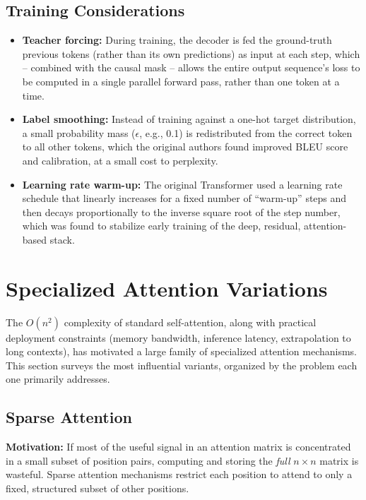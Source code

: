 \documentclass[11pt]{article}
\begin{document}
\subsection*{Training Considerations}

\begin{itemize}[leftmargin=1.5em]
    \item \textbf{Teacher forcing:} During training, the decoder is fed the ground-truth previous tokens (rather than its own predictions) as input at each step, which -- combined with the causal mask -- allows the entire output sequence's loss to be computed in a single parallel forward pass, rather than one token at a time.
    \item \textbf{Label smoothing:} Instead of training against a one-hot target distribution, a small probability mass ($\epsilon$, e.g., 0.1) is redistributed from the correct token to all other tokens, which the original authors found improved BLEU score and calibration, at a small cost to perplexity.
    \item \textbf{Learning rate warm-up:} The original Transformer used a learning rate schedule that linearly increases for a fixed number of ``warm-up'' steps and then decays proportionally to the inverse square root of the step number, which was found to stabilize early training of the deep, residual, attention-based stack.
\end{itemize}


\newpage

\section*{Specialized Attention Variations}

The $O(n^2)$ complexity of standard self-attention, along with practical deployment constraints (memory bandwidth, inference latency, extrapolation to long contexts), has motivated a large family of specialized attention mechanisms. This section surveys the most influential variants, organized by the problem each one primarily addresses.

\subsection*{Sparse Attention}

\textbf{Motivation:} If most of the useful signal in an attention matrix is concentrated in a small subset of position pairs, computing and storing the \emph{full} $n\times n$ matrix is wasteful. Sparse attention mechanisms restrict each position to attend to only a fixed, structured subset of other positions.
\end{document}
